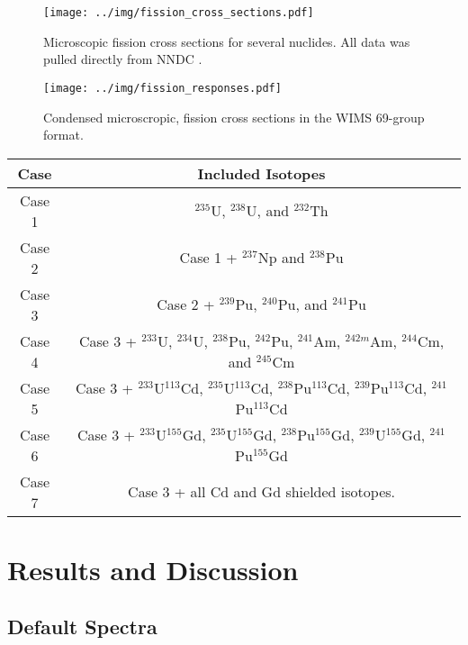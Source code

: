 \documentclass[journal]{IEEEtran}
\begin{document}
\begin{figure}[h!tb]
  \centering
  \texttt{[image: ../img/fission\_cross\_sections.pdf]}
  \caption{Microscopic fission cross sections for several nuclides.  All data was pulled directly from NNDC \cite{nndc}.}
  \label{fig:reactants}
\end{figure}


\begin{figure}[h!tb]
  \centering
  \texttt{[image: ../img/fission\_responses.pdf]}
  \caption{Condensed microscropic, fission cross sections  in the WIMS 69-group format.}
  \label{fig:response}
\end{figure}

\begin{table*}[h]
\centering
\begin{tabular}{ |c|c| }
 \hline
 \textbf{Case} & \textbf{Included Isotopes} \\
 \hline
 Case 1 & ${}^{235}$U, ${}^{238}$U, and ${}^{232}$Th \\
 \hline
 Case 2 & Case 1 + ${}^{237}$Np and ${}^{238}$Pu \\
 \hline
 Case 3 & Case 2 + ${}^{239}$Pu, ${}^{240}$Pu, and ${}^{241}$Pu \\
 \hline
 Case 4 & Case 3 + ${}^{233}$U, ${}^{234}$U, ${}^{238}$Pu, ${}^{242}$Pu, ${}^{241}$Am, ${}^{242m}$Am, ${}^{244}$Cm, and ${}^{245}$Cm \\
 \hline
 Case 5 & Case 3 + ${}^{233}$U${}^{113}$Cd, ${}^{235}$U${}^{113}$Cd, ${}^{238}$Pu${}^{113}$Cd, ${}^{239}$Pu${}^{113}$Cd, ${}^{241}$Pu${}^{113}$Cd \\
 \hline
 Case 6 & Case 3 + ${}^{233}$U${}^{155}$Gd, ${}^{235}$U${}^{155}$Gd, ${}^{238}$Pu${}^{155}$Gd, ${}^{239}$U${}^{155}$Gd, ${}^{241}$Pu${}^{155}$Gd \\
 \hline
 Case 7 & Case 3 + all Cd and Gd shielded isotopes. \\
 \hline
\end{tabular} \label{tab:isos}
\end{table*}


\section{Results and Discussion}

\subsection{Default Spectra}
\end{document}
